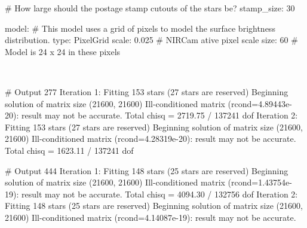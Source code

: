 \documentclass[a4 paper]{article}
\numberwithin{equation}{section}
\newcommand{\0}{\mathbf{0}}
\begin{document}
\begin{python}
# How large should the postage stamp cutouts of the stars be?
    stamp_size: 30

model:
    # This model uses a grid of pixels to model the surface brightness distribution.
    type: PixelGrid
    scale: 0.025      # NIRCam ative pixel scale
    size: 60          # Model is 24 x 24 in these pixels
\end{python}\\
\begin{python}
    # Output 277
Iteration 1: Fitting 153 stars
             (27 stars are reserved)
Beginning solution of matrix size (21600, 21600)
Ill-conditioned matrix (rcond=4.89443e-20): result may not be accurate.
             Total chisq = 2719.75 / 137241 dof
Iteration 2: Fitting 153 stars
             (27 stars are reserved)
Beginning solution of matrix size (21600, 21600)
Ill-conditioned matrix (rcond=4.28319e-20): result may not be accurate.
             Total chisq = 1623.11 / 137241 dof
\end{python}
\begin{python}
    # Output 444
Iteration 1: Fitting 148 stars
             (25 stars are reserved)
Beginning solution of matrix size (21600, 21600)
Ill-conditioned matrix (rcond=1.43754e-19): result may not be accurate.
             Total chisq = 4094.30 / 132756 dof
Iteration 2: Fitting 148 stars
             (25 stars are reserved)
Beginning solution of matrix size (21600, 21600)
Ill-conditioned matrix (rcond=4.14087e-19): result may not be accurate.
\end{python}
\end{document}
